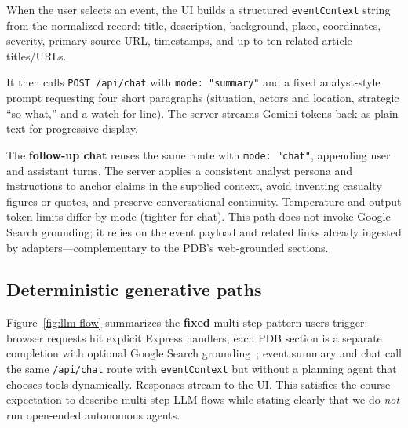 When the user selects an event, the UI builds a structured \texttt{eventContext} string from the normalized record: title, description, background, place, coordinates, severity, primary source URL, timestamps, and up to ten related article titles/URLs.

It then calls \texttt{POST /api/chat} with \texttt{mode: "summary"} and a fixed analyst-style prompt requesting four short paragraphs (situation, actors and location, strategic ``so what,'' and a watch-for line). The server streams Gemini tokens back as plain text for progressive display.

The \textbf{follow-up chat} reuses the same route with \texttt{mode: "chat"}, appending user and assistant turns. The server applies a consistent analyst persona and instructions to anchor claims in the supplied context, avoid inventing casualty figures or quotes, and preserve conversational continuity. Temperature and output token limits differ by mode (tighter for chat). This path does not invoke Google Search grounding; it relies on the event payload and related links already ingested by adapters---complementary to the PDB's web-grounded sections.

\subsection{Deterministic generative paths}

Figure~\ref{fig:llm-flow} summarizes the \textbf{fixed} multi-step pattern users trigger: browser requests hit explicit Express handlers; each PDB section is a separate completion with optional Google Search grounding~\cite{gemini-api}; event summary and chat call the same \texttt{/api/chat} route with \texttt{eventContext} but without a planning agent that chooses tools dynamically. Responses stream to the UI. This satisfies the course expectation to describe multi-step LLM flows while stating clearly that we do \emph{not} run open-ended autonomous agents.


